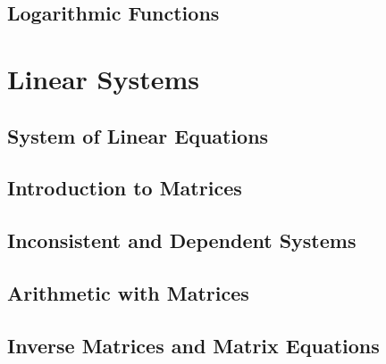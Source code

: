 \documentclass[oneside]{scrbook}
\begin{document}
\chapter{Logarithmic Functions}

\part{Linear Systems}
\chapter{System of Linear Equations}
\chapter{Introduction to Matrices}
\chapter{Inconsistent and Dependent Systems}
\chapter{Arithmetic with Matrices}
\chapter{Inverse Matrices and Matrix Equations}

\end{document}
